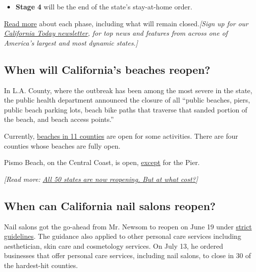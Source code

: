 \begin{itemize}
\tightlist
\item
  \textbf{Stage 4} will be the end of the state's stay-at-home order.
\end{itemize}

\href{https://www.nytimes3xbfgragh.onion/2020/04/29/us/california-reopen-coronavirus.html}{Read
more} about each phase, including what will remain closed.\emph{{[}Sign
up for our}
\href{https://www.nytimes3xbfgragh.onion/newsletters/california-today}{\emph{California
Today newsletter}}\emph{, for top news and features from across one of
America's largest and most dynamic states.{]}}

\hypertarget{when-will-californias-beaches-reopen}{%
\subsection{When will California's beaches
reopen?}\label{when-will-californias-beaches-reopen}}

In L.A. County, where the outbreak has been among the most severe in the
state, the public health department announced the closure of all
``public beaches, piers, public beach parking lots, beach bike paths
that traverse that sanded portion of the beach, and beach access
points.''

Currently,
\href{https://www.latimes.com/projects/california-coronavirus-cases-tracking-outbreak/beach-closures/}{beaches
in 11 counties} are open for some activities. There are four counties
whose beaches are fully open.

Pismo Beach, on the Central Coast, is open,
\href{http://pismobeach.org/938/CovidResponse}{except} for the Pier.

\emph{{[}Read more:}
\href{https://www.nytimes3xbfgragh.onion/2020/05/20/us/coronavirus-reopening-50-states.html}{\emph{All
50 states are now reopening. But at what cost?}}\emph{{]}}

\hypertarget{when-can-california-nail-salons-reopen}{%
\subsection{When can California nail salons
reopen?}\label{when-can-california-nail-salons-reopen}}

Nail salons got the go-ahead from Mr. Newsom to reopen on June 19 under
\href{https://covid19.ca.gov/pdf/expanded-personal-services.pdf}{strict
guidelines}. The guidance also applied to other personal care services
including aesthetician, skin care and cosmetology services. On July 13,
he ordered businesses that offer personal care services, including nail
salons, to close in 30 of the hardest-hit counties.

